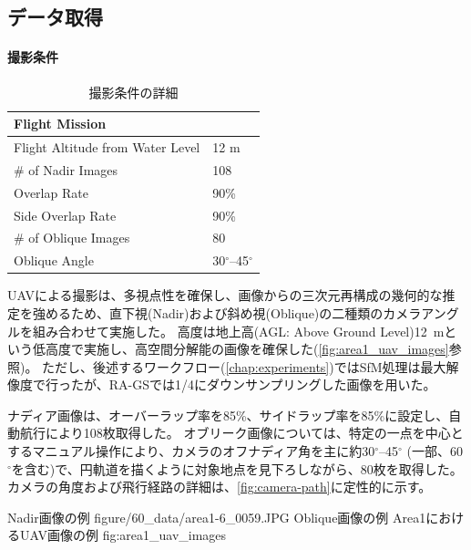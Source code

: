 \subsection{データ取得}\label{subsec:data-acquisition}

\paragraph{撮影条件}

\begin{table}[htbp]
  \centering
  \caption{撮影条件の詳細}
  \label{tab:flight-mission}
  \begin{tabular}{@{}ll@{}}

    \toprule
    \textbf{Flight Mission} & \\
    \midrule
    \quad Flight Altitude from Water Level & 12 m \\
    \quad \# of Nadir Images & 108 \\
    \quad Overlap Rate & 90\% \\
    \quad Side Overlap Rate & 90\% \\
    \quad \# of Oblique Images & 80 \\
    \quad Oblique Angle & 30$^\circ$--45$^\circ$ \\

    \bottomrule
  \end{tabular}
\end{table}

UAVによる撮影は、多視点性を確保し、画像からの三次元再構成の幾何的な推定を強めるため、直下視(Nadir)および斜め視(Oblique)の二種類のカメラアングルを組み合わせて実施した。
高度は地上高(AGL: Above Ground Level)\qty{12}{m}という低高度で実施し、高空間分解能の画像を確保した(\cref{fig:area1_uav_images}参照)。
ただし、後述するワークフロー(\cref{chap:experiments})ではSfM処理は最大解像度で行ったが、RA-GSでは1/4にダウンサンプリングした画像を用いた。

ナディア画像は、オーバーラップ率を85\%、サイドラップ率を85\%に設定し、自動航行により108枚取得した。
オブリーク画像については、特定の一点を中心とするマニュアル操作により、カメラのオフナディア角を主に約30$^\circ$--45$^\circ$ (一部、60$^\circ$を含む)で、円軌道を描くように対象地点を見下ろしながら、80枚を取得した。
カメラの角度および飛行経路の詳細は、\cref{fig:camera-path}に定性的に示す。

  {Nadir画像の例}
{figure/60_data/area1-6_0059.JPG}
  {Oblique画像の例}
{Area1におけるUAV画像の例}
{fig:area1_uav_images}

